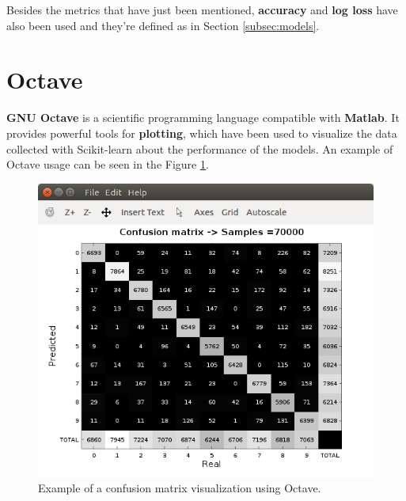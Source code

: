 Besides the metrics that have just been mentioned, \textbf{accuracy} and \textbf{log loss} have also been used and they're defined as in Section \ref{subsec:models}.

\section{Octave} \label{sec:octave}
\textbf{GNU Octave} \cite{octave} is a scientific programming language compatible with \textbf{Matlab}. It provides powerful tools for \textbf{plotting}, which have been used to visualize the data collected with Scikit-learn about the performance of the models. An example of Octave usage can be seen in the Figure \ref{fig:conf_mat}.
\begin{figure}
	\centering
	\includegraphics[width=12cm, keepaspectratio]{figures/conf_mat.png}
	\caption{Example of a confusion matrix visualization using Octave.}
	\label{fig:conf_mat}
\end{figure}